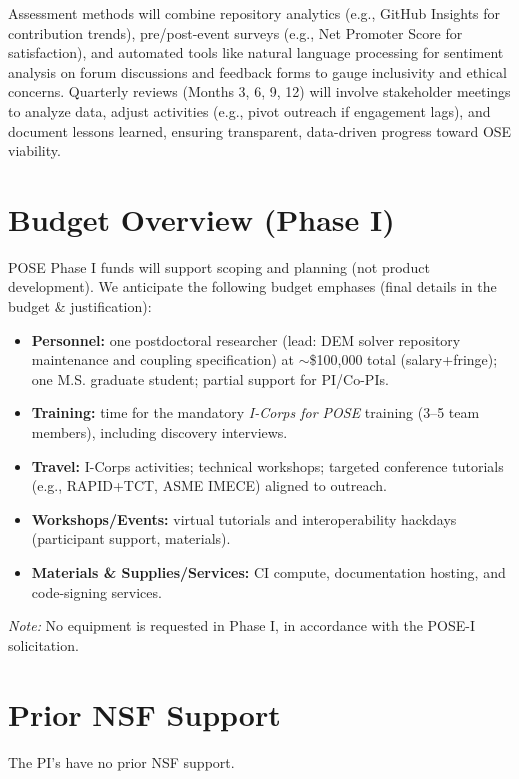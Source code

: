 \documentclass[11pt]{article}
\begin{document}
Assessment methods will combine repository analytics (e.g., GitHub Insights for contribution trends), pre/post-event surveys (e.g., Net Promoter Score for satisfaction), and automated tools like natural language processing for sentiment analysis on forum discussions and feedback forms to gauge inclusivity and ethical concerns. Quarterly reviews (Months 3, 6, 9, 12) will involve stakeholder meetings to analyze data, adjust activities (e.g., pivot outreach if engagement lags), and document lessons learned, ensuring transparent, data-driven progress toward OSE viability.
\vspace{-3pt}

\section*{Budget Overview (Phase I)}
\vspace{-3pt}
\noindent
POSE Phase I funds will support scoping and planning (not product development). We anticipate the following budget emphases (final details in the budget \& justification):
\begin{itemize}[leftmargin=*,nosep]
    \item \textbf{Personnel:} one postdoctoral researcher (lead: DEM solver repository maintenance and coupling specification) at $\sim$\$100{,}000 total (salary+fringe); one M.S. graduate student; partial support for PI/Co-PIs.
    \item \textbf{Training:} time for the mandatory \emph{I-Corps for POSE} training (3--5 team members), including discovery interviews.
    \item \textbf{Travel:} I-Corps activities; technical workshops; targeted conference tutorials (e.g., RAPID+TCT, ASME IMECE) aligned to outreach.
    \item \textbf{Workshops/Events:} virtual tutorials and interoperability hackdays (participant support, materials).
    \item \textbf{Materials \& Supplies/Services:} CI compute, documentation hosting, and code-signing services.
\end{itemize}
\noindent\textit{Note:} No equipment is requested in Phase I, in accordance with the POSE-I solicitation.
\section*{Prior NSF Support}
\noindent
The PI's have no prior NSF support.
\newpage



\end{document}
